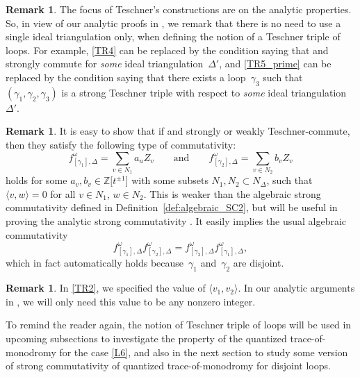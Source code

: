 \documentclass[10pt,a4paper]{amsart}
\numberwithin{equation}{section}
\theoremstyle{definition}
\newtheorem{Remark}[Theorem]{Remark}
\begin{document}
\begin{Remark}
The focus of Teschner's constructions are on the analytic properties. So, in view of our analytic proofs in \cite{sequel}, we remark that there is no need to use a single ideal triangulation only, when defining the notion of a Teschner triple of loops. For example, \ref{TR4} can be replaced by the condition saying that  and  strongly commute for {\em some} ideal triangulation~$\Delta'$, and \ref{TR5_prime} can be replaced by the condition saying that there exists a loop~$\gamma_3$ such that $(\gamma_1,\gamma_2,\gamma_3)$ is a strong Teschner triple with respect to {\em some} ideal triangulation~$\Delta'$.
\end{Remark}
\begin{Remark}
It is easy to show that if  and  strongly or weakly Teschner-commute, then they satisfy the following type of commutativity:
\[
f^\omega_{[\gamma_1],\Delta} = \sum_{v \in N_1} a_u Z_v \qquad \text{and} \qquad f^\omega_{[\gamma_2],\Delta} = \sum_{v\in N_2} b_v Z_v
\]
 holds for some $a_v,b_v \in \mathbb{Z}\bigl[t^{\pm 1}\bigr]$ with some subsets $N_1,N_2 \subset N_\Delta$, such that $\langle v,w\rangle =0$ for all ${v\in N_1}$, ${w\in N_2}$. This is weaker than the algebraic strong commutativity defined in Definition~\ref{def:algebraic_SC2}, but will be useful in proving the analytic strong commutativity \cite{sequel}. It easily implies the usual algebraic commutativity
\[
 f^\omega_{[\gamma_1],\Delta}f^\omega_{[\gamma_2],\Delta}=f^\omega_{[\gamma_2],\Delta}f^\omega_{[\gamma_1],\Delta},
\]
 which in fact automatically holds because~$\gamma_1$ and~$\gamma_2$ are disjoint.
\end{Remark}
\begin{Remark}\label{rem:bracket_of_v1_and_v2}
In \ref{TR2}, we specified the value of $\langle v_1,v_2\rangle$. In our analytic arguments in \cite{sequel}, we will only need this value to be any nonzero integer.
\end{Remark}
To remind the reader again, the notion of Teschner triple of loops will be used in upcoming subsections to investigate the property of the quantized trace-of-monodromy for the case \ref{L6}, and also in the next section to study some version of strong commutativity of quantized trace-of-monodromy for disjoint loops.
\end{document}
